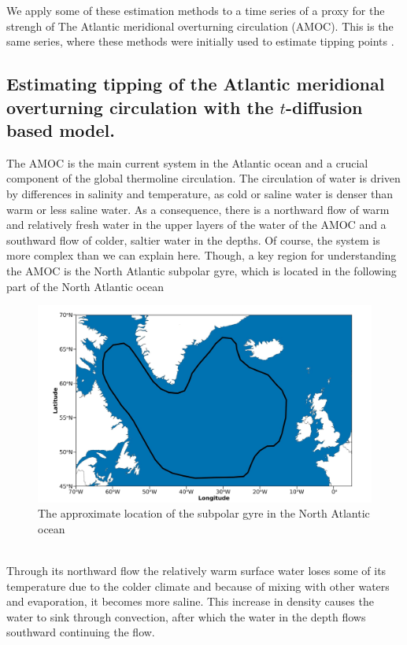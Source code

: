 We apply some of these estimation methods to a time series of a proxy for the strengh of The Atlantic meridional overturning circulation (AMOC). This is the same series,  where these methods were initially used to estimate tipping points \cite{Ditlevsen2023}.
\subsection{Estimating tipping of the Atlantic meridional overturning circulation with the \texorpdfstring{$t$}{t}-diffusion based model.}
The AMOC is the main current system in the Atlantic ocean and a crucial component of the global thermoline circulation. The circulation of water is driven by differences in salinity and temperature, as cold or saline water is denser than warm or less saline water. As a consequence, there is a northward flow of warm and relatively fresh water in the upper layers of the water of the AMOC and a southward flow of colder, saltier water in the depths. Of course, the system is more complex than we can explain here. Though, a key region for understanding the AMOC is the North Atlantic subpolar gyre, which is located in the following part of the North Atlantic ocean
\begin{figure}[h!]
    \begin{center}
        \includegraphics[scale = .175]{figures/NorthAtlanticOcean.jpeg}
    \end{center}
    \caption{The approximate location of the subpolar gyre in the North Atlantic ocean}
    \label{figure:subpolarGyre}
\end{figure}\\

Through its northward flow the relatively warm surface water loses some of its temperature due to the colder climate and because of mixing with other waters and evaporation, it becomes more saline. This increase in density causes the water to sink through convection, after which the water in the depth flows southward continuing the flow. 

